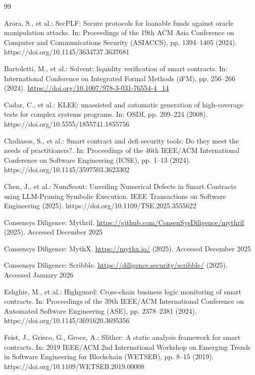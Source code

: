 \documentclass[pdflatex,sn-basic]{sn-jnl}%
\theoremstyle{thmstyleone}%
\theoremstyle{thmstyletwo}%
\theoremstyle{thmstylethree}%
\begin{document}
\begin{thebibliography}{99}

Arora, S., et al.: SecPLF: Secure protocols for loanable funds against oracle manipulation attacks. In: Proceedings of the 19th ACM Asia Conference on Computer and Communications Security (ASIACCS), pp. 1394--1405 (2024). https://doi.org/10.1145/3634737.3637681

Bartoletti, M., et al.: Solvent: liquidity verification of smart contracts. In: International Conference on Integrated Formal Methods (iFM), pp. 256--266 (2024). \url{https://doi.org/10.1007/978-3-031-76554-4_14}

Cadar, C., et al.: KLEE: unassisted and automatic generation of high-coverage tests for complex systems programs. In: OSDI, pp. 209--224 (2008). https://doi.org/10.5555/1855741.1855756

Chaliasos, S., et al.: Smart contract and defi security tools: Do they meet the needs of practitioners?. In: Proceedings of the 46th IEEE/ACM International Conference on Software Engineering (ICSE), pp. 1--13 (2024). https://doi.org/10.1145/3597503.3623302

Chen, J., et al.: NumScout: Unveiling Numerical Defects in Smart Contracts using LLM-Pruning Symbolic Execution. IEEE Transactions on Software Engineering (2025). https://doi.org/10.1109/TSE.2025.3555622

Consensys Diligence: Mythril. \url{https://github.com/ConsenSysDiligence/mythril} (2025). Accessed December 2025

Consensys Diligence: MythX. \url{https://mythx.io/} (2025). Accessed December 2025

Consensys Diligence: Scribble. \url{https://diligence.security/scribble/} (2025). Accessed January 2026

Eshghie, M., et al.: Highguard: Cross-chain business logic monitoring of smart contracts. In: Proceedings of the 39th IEEE/ACM International Conference on Automated Software Engineering (ASE), pp. 2378--2381 (2024). https://doi.org/10.1145/3691620.3695356

Feist, J., Grieco, G., Groce, A.: Slither: A static analysis framework for smart contracts. In: 2019 IEEE/ACM 2nd International Workshop on Emerging Trends in Software Engineering for Blockchain (WETSEB), pp. 8--15 (2019). https://doi.org/10.1109/WETSEB.2019.00008


\end{thebibliography}
\end{document}
